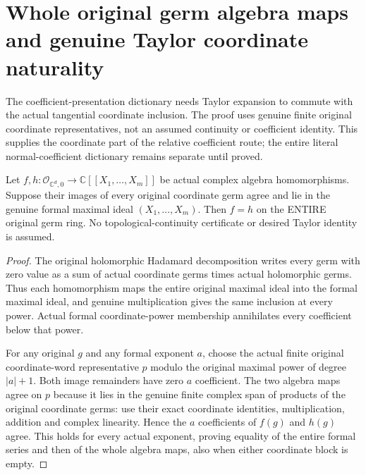 \section{Whole original germ algebra maps and genuine Taylor coordinate naturality}

The coefficient-presentation dictionary needs Taylor expansion to commute
with the actual tangential coordinate inclusion. The proof uses genuine
finite original coordinate representatives, not an assumed continuity or
coefficient identity. This supplies the coordinate part of the relative
coefficient route; the entire literal normal-coefficient dictionary remains
separate until proved.

\begin{theorem}
\label{hir:actual-formal-germ-hom-coordinate-uniqueness}
\leanok
Let $f,h:\mathcal O_{\mathbb C^d,0}\to\mathbb C[[X_1,\ldots,X_m]]$
be actual complex algebra homomorphisms. Suppose their images of every
original coordinate germ agree and lie in the genuine formal maximal ideal
$(X_1,\ldots,X_m)$. Then $f=h$ on the ENTIRE original germ ring.
No topological-continuity certificate or desired Taylor identity is assumed.
\end{theorem}
\begin{proof}
The original holomorphic Hadamard decomposition writes every germ with
zero value as a sum of actual coordinate germs times actual holomorphic
germs. Thus each homomorphism maps the entire original maximal ideal into
the formal maximal ideal, and genuine multiplication gives the same
inclusion at every power. Actual formal coordinate-power membership
annihilates every coefficient below that power.

For any original $g$ and any formal exponent $a$, choose the actual finite
original coordinate-word representative $p$ modulo the original maximal
power of degree $|a|+1$. Both image remainders have zero $a$ coefficient.
The two algebra maps agree on $p$ because it lies in the genuine finite
complex span of products of the original coordinate germs: use their exact
coordinate identities, multiplication, addition and complex linearity.
Hence the $a$ coefficients of $f(g)$ and $h(g)$ agree. This holds for every
actual exponent, proving equality of the entire formal series and then
of the whole algebra maps, also when either coordinate block is empty.
\end{proof}

